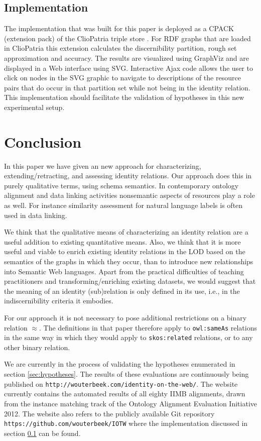 \documentclass[letterpaper]{article}
\begin{document}
\subsection{Implementation}
\label{sec:implementation}

The implementation that was built for this paper is deployed as a CPACK (extension pack) of the ClioPatria triple store \cite{schreiber_2006}. For RDF graphs that are loaded in ClioPatria this extension calculates the discernibility partition, rough set approximation and accuracy. The results are visualized using GraphViz and are displayed in a Web interface using SVG. Interactive Ajax code allows the user to click on nodes in the SVG graphic to navigate to descriptions of the resource pairs that do occur in that partition set while not being in the identity relation. This implementation should facilitate the validation of hypotheses in this new experimental setup.

\section{Conclusion}
\label{sec:conclusion}

In this paper we have given an new approach for characterizing, extending/retracting, and assessing identity relations. Our approach does this in purely qualitative terms, using schema semantics. In contemporary ontology alignment and data linking activities nonsemantic aspects of resources play a role as well. For instance similarity assessment for natural language labels is often used in data linking.

We think that the qualitative means of characterizing an identity relation are a useful addition to existing quantitative means. Also, we think that it is more useful and viable to enrich existing identity relations in the LOD based on the semantics of the graphs in which they occur, than to introduce new relationships into Semantic Web languages. Apart from the practical difficulties of teaching practitioners and transforming/enriching existing datasets, we would suggest that the meaning of an identity (sub)relation is only defined in its use, i.e., in the indiscernibility criteria it embodies.

For our approach it is not necessary to pose additional restrictions on a binary relation $\approx$. The definitions in that paper therefore apply to \verb|owl:sameAs| relations in the same way in which they would apply to \verb|skos:related| relations, or to any other binary relation.

We are currently in the process of validating the hypotheses enumerated in section \ref{sec:hypotheses}. The results of these evaluations are continuously being published on \verb|http://wouterbeek.com/identity-on-the-web/|. The website currently contains the automated results of all eighty IIMB alignments, drawn from the instance matching track of the Ontology Alignment Evaluation Initiative 2012. The website also refers to the publicly available Git repository \verb|https://github.com/wouterbeek/IOTW| where the implementation discussed in section \ref{sec:implementation} can be found.



\end{document}
